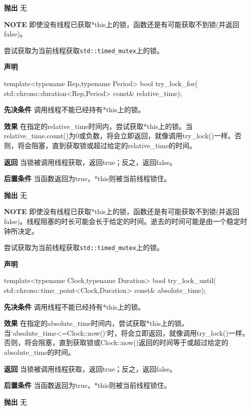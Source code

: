 \textbf{抛出}
无

\textbf{NOTE} 即使没有线程已获取*this上的锁，函数还是有可能获取不到锁(并返回false)。


尝试获取为当前线程获取\texttt{std::timed\_mutex}上的锁。

\textbf{声明}

\begin{cpp}
template<typename Rep,typename Period>
bool try_lock_for(
    std::chrono::duration<Rep,Period> const& relative_time);
\end{cpp}

\textbf{先决条件}
调用线程不能已经持有*this上的锁。

\textbf{效果}
在指定的relative\_time时间内，尝试获取*this上的锁。当relative\_time.count()为0或负数，将会立即返回，就像调用try\_lock()一样。否则，将会阻塞，直到获取锁或超过给定的relative\_time的时间。

\textbf{返回}
当锁被调用线程获取，返回true；反之，返回false。

\textbf{后置条件}
当函数返回为true，*this则被当前线程锁住。

\textbf{抛出}
无

\textbf{NOTE} 即使没有线程已获取*this上的锁，函数还是有可能获取不到锁(并返回false)。线程阻塞的时长可能会长于给定的时间。逝去的时间可能是由一个稳定时钟所决定。


尝试获取为当前线程获取\texttt{std::timed\_mutex}上的锁。

\textbf{声明}

\begin{cpp}
template<typename Clock,typename Duration>
bool try_lock_until(
    std::chrono::time_point<Clock,Duration> const& absolute_time);
\end{cpp}

\textbf{先决条件}
调用线程不能已经持有*this上的锁。

\textbf{效果}
在指定的absolute\_time时间内，尝试获取*this上的锁。当`absolute\_time<=Clock::now()`时，将会立即返回，就像调用try\_lock()一样。否则，将会阻塞，直到获取锁或Clock::now()返回的时间等于或超过给定的absolute\_time的时间。

\textbf{返回}
当锁被调用线程获取，返回true；反之，返回false。

\textbf{后置条件}
当函数返回为true，*this则被当前线程锁住。

\textbf{抛出}
无

